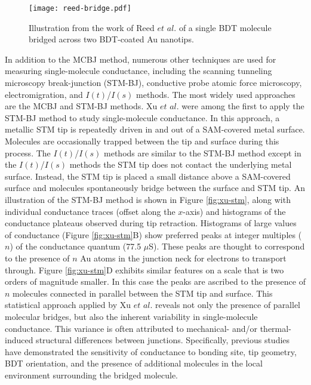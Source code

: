 \documentclass[10pt]{report}  %
\begin{document}
%
% 
%
\begin{figure}[t!]
	\centering
	\texttt{[image: reed-bridge.pdf]}
	\caption{Illustration from the work of Reed $et$ $al.$\protect\cite{Reed:1997} of a single BDT molecule bridged across two BDT-coated Au nanotips. }
	\label{fig:reed-bridge}
\end{figure}

In addition to the MCBJ method, numerous other techniques are used for measuring single-molecule conductance, including the scanning tunneling microscopy break-junction (STM-BJ),\cite{Xiao:2004,Venkataraman-nature:2006,Venkataraman:2006,Ulrich:2006,Huang:2007,Fujii:2008,Li:2008,Diez-Perez:2009,Lu:2009,Kamenetska:2009,Mishchenko:2010,Zhou:2010,Xing:2010,Schneebeli:2011,Fatemi:2011,Meisner:2011,Guo-jacs:2011,Leary:2011,Li:2011,Arroyo:2011,Cheng:2011,Kiguchi:2012,Bruot:2012} conductive probe atomic force microscopy,\cite{Cui:2001,Beebe:2002,Lu:2009,Frei:2011,Frei:2012} electromigration,\cite{Song:2009} and $I(t)$/$I(s)$ \cite{Haiss:2003,Haiss:2006,Haiss:2008,Haiss:2009,Leary:2009,Kay:2011} methods. The most widely used approaches are the MCBJ and STM-BJ methods. Xu $et$ $al.$ \cite{Xu:2003} were among the first to apply the STM-BJ method to study single-molecule conductance. In this approach, a metallic STM tip is repeatedly driven in and out of a SAM-covered metal surface. Molecules are occasionally trapped between the tip and surface during this process. The $I(t)$/$I(s)$ methods are similar to the STM-BJ method except in the $I(t)$/$I(s)$ methods the STM tip does not contact the underlying metal surface. Instead, the STM tip is placed a small distance above a SAM-covered surface and molecules spontaneously bridge between the surface and STM tip.  An illustration of the STM-BJ method is shown in Figure \ref{fig:xu-stm}, along with individual conductance traces (offset along the $x$-axis) and histograms of the conductance plateaus observed during tip retraction. Histograms of large values of conductance (Figure \ref{fig:xu-stm}B) show preferred peaks at integer multiples ($n$) of the conductance quantum (77.5 $\mu$S). These peaks are thought to correspond to the presence of $n$ Au atoms in the junction neck for electrons to transport through. Figure \ref{fig:xu-stm}D exhibits similar features on a scale that is two orders of magnitude smaller. In this case the peaks are ascribed to the presence of $n$ molecules connected in parallel between the STM tip and surface. This statistical approach applied by Xu $et$ $al.$\cite{Xu:2003} reveals not only the presence of parallel molecular bridges, but also the inherent variability in single-molecule conductance. This variance is often attributed to mechanical- and/or thermal-induced structural differences between junctions. Specifically, previous studies have demonstrated the sensitivity of conductance to bonding site,\cite{Nara:2004} tip geometry,\cite{Haiss:2009} BDT orientation,\cite{Haiss:2008} and the presence of additional molecules in the local environment surrounding the bridged molecule. \cite{Fatemi:2011}
\end{document}
